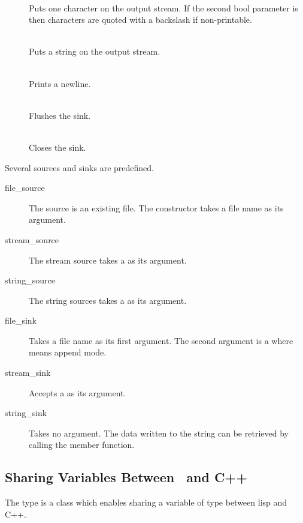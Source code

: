 \begin{description}
  \item[]  \\ Puts one character on
    the output stream. If the second bool parameter is  then
    characters are quoted with a backslash if non-printable.
  \item[]  \\ Puts a
    string on the output stream.
  \item[]  \\ Prints a newline.
  \item[]  \\ Flushes the sink.
  \item[]  \\ Closes the sink.
\end{description}

Several sources and sinks are predefined.

\begin{description}
  \item[file\_source] The source is an existing file. The constructor
    takes a file name as its argument.
  \item[stream\_source] The stream source takes a 
    as its argument.
  \item[string\_source] The string sources takes a 
    as its argument.
  \item[file\_sink] Takes a file name as its first argument. The
    second argument is a  where  means append
    mode.
  \item[stream\_sink] Accepts a  as its argument.
  \item[string\_sink] Takes no argument. The data written to the
    string can be retrieved by calling the
     member function.
\end{description}

\subsection{Sharing Variables Between \lips\ and \textsf{C++}}
The type  is a class which enables sharing a
variable of type  between lisp and \textsf{C++}.

